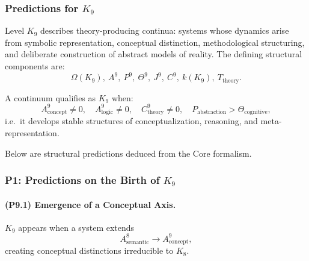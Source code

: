

\subsubsection{Predictions for \texorpdfstring{$K_9$}{K_9}}
\label{sec:predictions-k9}

Level $K_9$ describes theory-producing continua: 
systems whose dynamics arise from symbolic representation, 
conceptual distinction, methodological structuring, 
and deliberate construction of abstract models of reality.  
The defining structural components are:
\[
\Omega(K_9),\ 
A^{9},\ 
P^{9},\ 
\Theta^{9},\ 
J^{9},\ 
C^{9},\ 
k(K_9),\ 
T_{\mathrm{theory}}.
\]

A continuum qualifies as $K_9$ when:
\[
A_{\mathrm{concept}}^9 \neq 0, \quad
A_{\mathrm{logic}}^9 \neq 0, \quad
C_{\mathrm{theory}}^9 \neq 0,
\quad
P_{\mathrm{abstraction}} > \Theta_{\mathrm{cognitive}},
\]
i.e.\ it develops stable structures of conceptualization, reasoning, 
and meta-representation.

Below are structural predictions deduced from the Core formalism.

\subsubsection{P1: Predictions on the Birth of \texorpdfstring{$K_9$}{K_9}}

\paragraph{(P9.1) Emergence of a Conceptual Axis.}
$K_9$ appears when a system extends 
\[
A_{\mathrm{semantic}}^{8} \to A_{\mathrm{concept}}^{9},
\]
creating conceptual distinctions irreducible to $K_8$.

